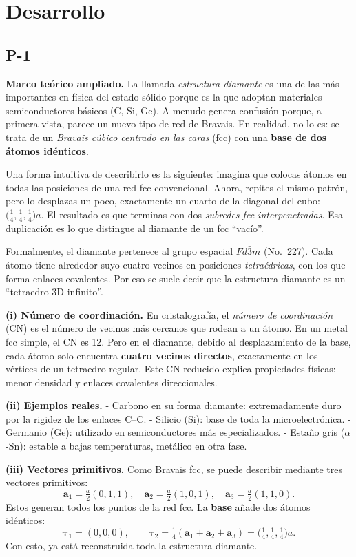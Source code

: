 \documentclass{article}
\begin{document}
\section{Desarrollo}

\subsection{P-1}

\textbf{Marco teórico ampliado.}  
La llamada \emph{estructura diamante} es una de las más importantes en física del estado sólido porque es la que adoptan materiales semiconductores básicos (C, Si, Ge). A menudo genera confusión porque, a primera vista, parece un nuevo tipo de red de Bravais. En realidad, no lo es: se trata de un \emph{Bravais cúbico centrado en las caras} (fcc) con una \textbf{base de dos átomos idénticos}.  

Una forma intuitiva de describirlo es la siguiente: imagina que colocas átomos en todas las posiciones de una red fcc convencional. Ahora, repites el mismo patrón, pero lo desplazas un poco, exactamente un cuarto de la diagonal del cubo: \(\big(\tfrac14,\tfrac14,\tfrac14\big)a\). El resultado es que terminas con dos \emph{subredes fcc interpenetradas}. Esa duplicación es lo que distingue al diamante de un fcc “vacío”.

Formalmente, el diamante pertenece al grupo espacial \(Fd\bar{3}m\) (No.~227). Cada átomo tiene alrededor suyo cuatro vecinos en posiciones \emph{tetraédricas}, con los que forma enlaces covalentes. Por eso se suele decir que la estructura diamante es un “tetraedro 3D infinito”.

\medskip
\textbf{(i) Número de coordinación.}  
En cristalografía, el \emph{número de coordinación} (CN) es el número de vecinos más cercanos que rodean a un átomo. En un metal fcc simple, el CN es 12. Pero en el diamante, debido al desplazamiento de la base, cada átomo solo encuentra \textbf{cuatro vecinos directos}, exactamente en los vértices de un tetraedro regular. Este CN reducido explica propiedades físicas: menor densidad y enlaces covalentes direccionales.

\medskip
\textbf{(ii) Ejemplos reales.}  
- Carbono en su forma diamante: extremadamente duro por la rigidez de los enlaces C–C.  
- Silicio (Si): base de toda la microelectrónica.  
- Germanio (Ge): utilizado en semiconductores más especializados.  
- Estaño gris (\(\alpha\)-Sn): estable a bajas temperaturas, metálico en otra fase.  

\medskip
\textbf{(iii) Vectores primitivos.}  
Como Bravais fcc, se puede describir mediante tres vectores primitivos:
\[
\mathbf{a}_1=\tfrac{a}{2}(0,1,1),\quad
\mathbf{a}_2=\tfrac{a}{2}(1,0,1),\quad
\mathbf{a}_3=\tfrac{a}{2}(1,1,0).
\]
Estos generan todos los puntos de la red fcc. La \textbf{base} añade dos átomos idénticos:
\[
\boldsymbol{\tau}_1=(0,0,0),\qquad
\boldsymbol{\tau}_2=\tfrac{1}{4}(\mathbf{a}_1+\mathbf{a}_2+\mathbf{a}_3)=\big(\tfrac14,\tfrac14,\tfrac14\big)a.
\]
Con esto, ya está reconstruida toda la estructura diamante.
\end{document}
